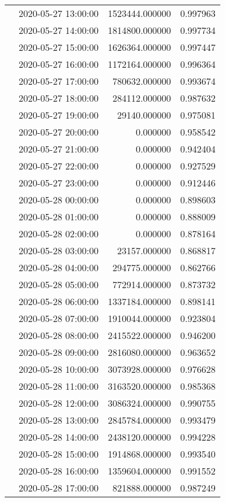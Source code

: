 \begin{tabular}{llrr}
 & 2020-05-27 13:00:00 & 1523444.000000 & 0.997963 \\
 & 2020-05-27 14:00:00 & 1814800.000000 & 0.997734 \\
 & 2020-05-27 15:00:00 & 1626364.000000 & 0.997447 \\
 & 2020-05-27 16:00:00 & 1172164.000000 & 0.996364 \\
 & 2020-05-27 17:00:00 & 780632.000000 & 0.993674 \\
 & 2020-05-27 18:00:00 & 284112.000000 & 0.987632 \\
 & 2020-05-27 19:00:00 & 29140.000000 & 0.975081 \\
 & 2020-05-27 20:00:00 & 0.000000 & 0.958542 \\
 & 2020-05-27 21:00:00 & 0.000000 & 0.942404 \\
 & 2020-05-27 22:00:00 & 0.000000 & 0.927529 \\
 & 2020-05-27 23:00:00 & 0.000000 & 0.912446 \\
 & 2020-05-28 00:00:00 & 0.000000 & 0.898603 \\
 & 2020-05-28 01:00:00 & 0.000000 & 0.888009 \\
 & 2020-05-28 02:00:00 & 0.000000 & 0.878164 \\
 & 2020-05-28 03:00:00 & 23157.000000 & 0.868817 \\
 & 2020-05-28 04:00:00 & 294775.000000 & 0.862766 \\
 & 2020-05-28 05:00:00 & 772914.000000 & 0.873732 \\
 & 2020-05-28 06:00:00 & 1337184.000000 & 0.898141 \\
 & 2020-05-28 07:00:00 & 1910044.000000 & 0.923804 \\
 & 2020-05-28 08:00:00 & 2415522.000000 & 0.946200 \\
 & 2020-05-28 09:00:00 & 2816080.000000 & 0.963652 \\
 & 2020-05-28 10:00:00 & 3073928.000000 & 0.976628 \\
 & 2020-05-28 11:00:00 & 3163520.000000 & 0.985368 \\
 & 2020-05-28 12:00:00 & 3086324.000000 & 0.990755 \\
 & 2020-05-28 13:00:00 & 2845784.000000 & 0.993479 \\
 & 2020-05-28 14:00:00 & 2438120.000000 & 0.994228 \\
 & 2020-05-28 15:00:00 & 1914868.000000 & 0.993540 \\
 & 2020-05-28 16:00:00 & 1359604.000000 & 0.991552 \\
 & 2020-05-28 17:00:00 & 821888.000000 & 0.987249 \\

\end{tabular}
